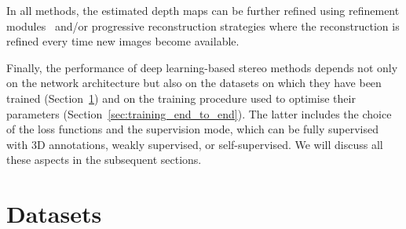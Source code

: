 \documentclass[10pt,journal,compsoc]{IEEEtran}
\begin{document}
In all methods, the estimated depth maps can  be further refined using refinement modules~\cite{eigen2014depth,li2015depth,wang2015designing,eigen2015predicting} and/or  progressive reconstruction strategies where the reconstruction is  refined every time new images become available. 


Finally, the performance of deep learning-based stereo methods depends not only on the network architecture but also on the datasets on which they have been trained (Section~\ref{sec:datasets}) and on the training procedure used to optimise their parameters (Section~\ref{sec:training_end_to_end}). The latter includes the choice of the loss functions and the supervision mode, which can be fully supervised with 3D annotations, weakly supervised, or self-supervised. We will discuss all these aspects in the subsequent sections.






\section{Datasets}
\label{sec:datasets}
\end{document}
